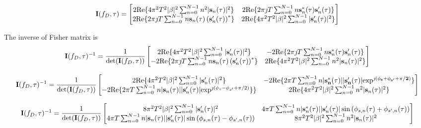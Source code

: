\documentclass[12pt,a4paper,twoside,english]{article}
\begin{document}
\[  \mathbf{I}(f_D,\tau) = 
  \begin{bmatrix}
   2\textrm{Re}\{ 4 \pi^2 T^2|\beta|^2 \sum^{N-1}_{n=0}n^2|\mathbf{s}_n (\tau)|^2  \} &
   2\textrm{Re}\{ 2\pi \jmath T   \sum^{N-1}_{n=0} n\mathbf{s}_n^{*} (\tau)\mathbf{s}_n^{\prime} (\tau) \} \\
     2\textrm{Re}\{ 2\pi \jmath T   \sum^{N-1}_{n=0} n\mathbf{s}_n(\tau)\left(\mathbf{s}_n^{\prime} (\tau)\right)^{*} \} & 2\textrm{Re}\{  4 \pi^2 T^2 |\beta|^2 \sum^{N-1}_{n=0}|\mathbf{s}^{\prime}_n (\tau)|^2 \} \\
  \end{bmatrix}
\]

The inverse of Fisher matrix is
\[  \mathbf{I}(f_D,\tau)^{-1} = \frac{1}{\textrm{det}(\mathbf{I}(f_D,\tau))}
\begin{bmatrix}
  2\textrm{Re}\{  4 \pi^2 T^2 |\beta|^2 \sum^{N-1}_{n=0}|\mathbf{s}^{\prime}_n
  (\tau)|^2 \}  &
   - 2\textrm{Re}\{ 2\pi \jmath T   \sum^{N-1}_{n=0} n\mathbf{s}_n^{*} (\tau)\mathbf{s}_n^{\prime} (\tau) \} \\
     - 2\textrm{Re}\{ 2\pi \jmath T   \sum^{N-1}_{n=0}
     n\mathbf{s}_n(\tau)\left(\mathbf{s}_n^{\prime} (\tau)\right)^{*} \} & 2\textrm{Re}\{ 4
     \pi^2 T^2|\beta|^2 \sum^{N-1}_{n=0}n^2|\mathbf{s}_n (\tau)|^2  \}  \\
\end{bmatrix}
\]

\[  \mathbf{I}(f_D,\tau)^{-1} = \frac{1}{\textrm{det}(\mathbf{I}(f_D,\tau))}
\begin{bmatrix}
  2\textrm{Re}\{  4 \pi^2 T^2 |\beta|^2 \sum^{N-1}_{n=0}|\mathbf{s}^{\prime}_n
  (\tau)|^2 \}  &
   - 2\textrm{Re}\{ 2\pi T   \sum^{N-1}_{n=0} n\bf|s_n^{*}
   (\tau)||\mathbf{s}_n^{\prime} (\tau)|\textrm{exp}^{\jmath (\phi_{s} + \phi_{s^{\prime}} + \pi/2)} \} \\
     - 2\textrm{Re}\{ 2\pi T   \sum^{N-1}_{n=0}
     n|\mathbf{s}_n(\tau)||\mathbf{s}_n^{\prime} (\tau)|\textrm{exp}^{\jmath (\phi_{s} - \phi_{s^{\prime}} + \pi/2)} \} \} & 2\textrm{Re}\{ 4
     \pi^2 T^2|\beta|^2 \sum^{N-1}_{n=0}n^2|\mathbf{s}_n (\tau)|^2  \}  \\
\end{bmatrix}
\]



\[  \mathbf{I}(f_D,\tau)^{-1} = \frac{1}{\textrm{det}(\mathbf{I}(f_D,\tau))}
\begin{bmatrix}
  8 \pi^2 T^2 |\beta|^2 \sum^{N-1}_{n=0}|\mathbf{s}^{\prime}_n
  (\tau)|^2 &
    4\pi T   \sum^{N-1}_{n=0} n|\mathbf{s}_n^{*}
   (\tau)||\mathbf{s}_n^{\prime} (\tau)|\sin{(\phi_{s,n}(\tau) + \phi_{s^{\prime},n}(\tau))} \\
     4\pi T   \sum^{N-1}_{n=0}
     n|\mathbf{s}_n(\tau)||\mathbf{s}_n^{\prime} (\tau)|\sin{(\phi_{s,n}(\tau) - \phi_{s^{\prime},n}(\tau))}  & 8
     \pi^2 T^2|\beta|^2 \sum^{N-1}_{n=0}n^2|\mathbf{s}_n (\tau)|^2  \\
\end{bmatrix}
\]
\end{document}
